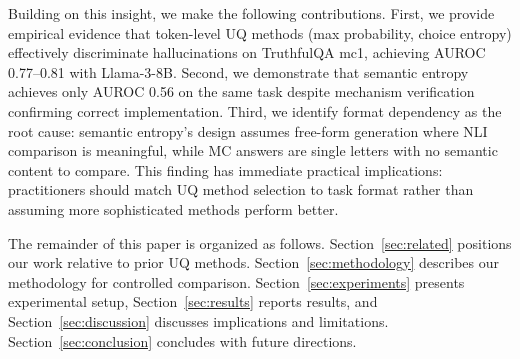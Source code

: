 Building on this insight, we make the following contributions. First, we provide empirical evidence that token-level UQ methods (max probability, choice entropy) effectively discriminate hallucinations on TruthfulQA mc1, achieving AUROC 0.77--0.81 with Llama-3-8B. Second, we demonstrate that semantic entropy achieves only AUROC 0.56 on the same task despite mechanism verification confirming correct implementation. Third, we identify format dependency as the root cause: semantic entropy's design assumes free-form generation where NLI comparison is meaningful, while MC answers are single letters with no semantic content to compare. This finding has immediate practical implications: practitioners should match UQ method selection to task format rather than assuming more sophisticated methods perform better.

The remainder of this paper is organized as follows. Section~\ref{sec:related} positions our work relative to prior UQ methods. Section~\ref{sec:methodology} describes our methodology for controlled comparison. Section~\ref{sec:experiments} presents experimental setup, Section~\ref{sec:results} reports results, and Section~\ref{sec:discussion} discusses implications and limitations. Section~\ref{sec:conclusion} concludes with future directions.
